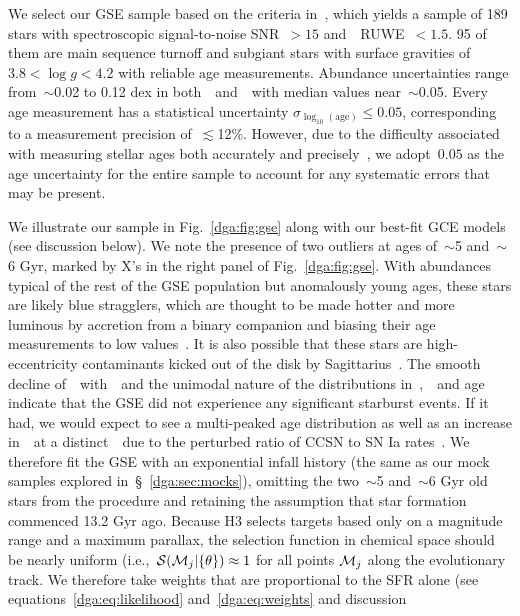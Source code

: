 We select our GSE sample based on the criteria in~\citet{Conroy2022}, which
yields a sample of 189 stars with spectroscopic signal-to-noise
SNR~$> 15$ and~\gaia~RUWE~$< 1.5$.
95 of them are main sequence turnoff and subgiant stars with surface gravities
of~$3.8 < \log g < 4.2$ with reliable age measurements.
Abundance uncertainties range from~$\sim$0.02 to 0.12 dex in
both~\feh~and~\afe~with median values near~$\sim$0.05.
Every age measurement has a statistical uncertainty
$\sigma_{\log_{10}(\text{age})} \leq 0.05$, corresponding to a measurement
precision of~$\lesssim$12\%.
However, due to the difficulty associated with measuring stellar ages both
accurately and precisely~\citep[e.g.,][]{Soderblom2010, Chaplin2013, Angus2019},
we adopt~$0.05$ as the age uncertainty for the entire sample to account for any
systematic errors that may be present.
\par
We illustrate our sample in Fig.~\ref{dga:fig:gse} along with our best-fit GCE
models (see discussion below).
We note the presence of two outliers at ages of~$\sim$5 and~$\sim$6 Gyr, marked
by X's in the right panel of Fig.~\ref{dga:fig:gse}.
With abundances typical of the rest of the GSE population but anomalously young
ages, these stars are likely blue stragglers, which are thought to be made
hotter and more luminous by accretion from a binary companion and biasing their
age measurements to low values~\citep[e.g.,][]{Bond1971, Stryker1993}.
It is also possible that these stars are high-eccentricity contaminants kicked
out of the disk by Sagittarius~\citep[e.g.,][]{Donlon2020}.
The smooth decline of~\afe~with~\feh~and the unimodal nature of the
distributions in~\feh,~\afe~and age indicate that the GSE did not experience
any significant starburst events.
If it had, we would expect to see a multi-peaked age distribution
as well as an increase in~\afe~at a distinct~\feh~due to the perturbed ratio of
CCSN to SN Ia rates~\citep{Johnson2020}.
We therefore fit the GSE with an exponential infall history (the same as our
mock samples explored in~\S~\ref{dga:sec:mocks}), omitting the two~$\sim$5
and~$\sim$6 Gyr old stars from the procedure and retaining the assumption that
star formation commenced 13.2 Gyr ago.
Because H3 selects targets based only on a magnitude range and a maximum
parallax, the selection function in chemical space should be nearly uniform
(i.e.,~$\mathcal{S}(\mathcal{M}_j | \{\theta\}) \approx 1$ for all points
$\mathcal{M}_j$ along the evolutionary track.
We therefore take weights that are proportional to the SFR alone (see
equations~\ref{dga:eq:likelihood} and~\ref{dga:eq:weights} and discussion
